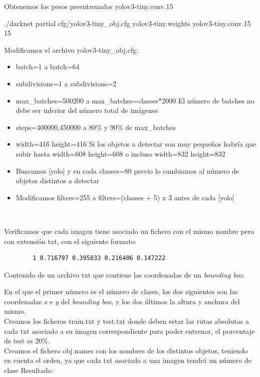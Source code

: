 Obtenemos los pesos preentrenados yolov3-tiny.conv.15

./darknet partial cfg/yolov3-tiny\_obj.cfg yolov3-tiny.weights yolov3-tiny.conv.15 15

Modificamos el archivo yolov3-tiny\_obj.cfg:

\begin{itemize}
	\item batch=1 a batch=64
	\item subdivisions=1 a subdivisions=2
	\item max\_batches=500200 a max\_batches=classes*2000 El número de batches no debe ser inferior del número total de imágenes
	\item steps=400000,450000 a 80\% y 90\% de max\_batches
	\item width=416 height=416 Si los objetos a detectar son muy pequeños habría que subir hasta width=608 height=608 o incluso width=832 height=832
	\item Buscamos [yolo] y en cada classes=80 previo lo cambiamos al número de objetos distintos a detectar
	\item Modificamos filters=255 a filters=(classes + 5) x 3 antes de cada [yolo]
\end{itemize}\

Verificamos que cada imagen tiene asociado un fichero con el mismo nombre pero con extensión txt, con el siguiente formato:
\begin{code}[h]
	\begin{lstlisting}
		1 0.716797 0.395833 0.216406 0.147222 
	\end{lstlisting}
	\caption[Contenido de un archivo txt que contiene las coordenadas de un \textit{bounding box}.]{Contenido de un archivo txt que contiene las coordenadas de un
		\textit{bounding box}.}
	\label{cod:txtboundingbox}
\end{code}

En el que el primer número es el número de clases, los dos siguientes son las coordenadas \textit{x} e \textit{y} del \textit{bounding box}, y los dos últimos la altura y anchura del mismo.\\

Creamos los ficheros train.txt y test.txt donde deben estar las rutas absolutas a cada txt asociado a su imagen correspondiente para poder entrenar, el porcentaje de test es
20\%.\\

Creamos el fichero obj.names con los nombres de los distintos objetos, teniendo en cuenta el orden, ya que cada txt asociado a una imagen tendrá un número de clase Resultado:

